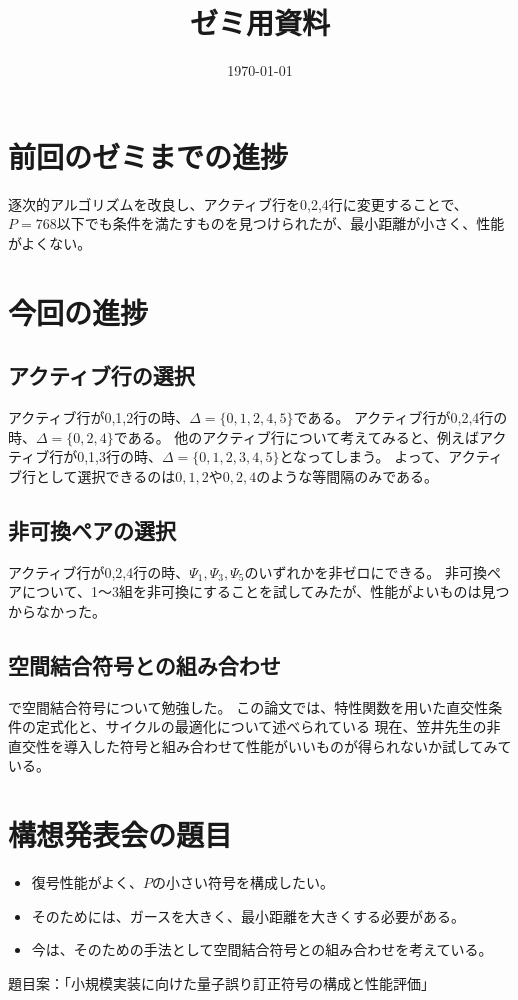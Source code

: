\documentclass[a4paper,11pt,dvipdfmx]{jsarticle}
\theoremstyle{definition}
\begin{document}
\title{ゼミ用資料}
\author{}
\date{\today}
\maketitle

\section{前回のゼミまでの進捗}
逐次的アルゴリズムを改良し、アクティブ行を0,2,4行に変更することで、$P=768$以下でも条件を満たすものを見つけられたが、最小距離が小さく、性能がよくない。

\section{今回の進捗}

\subsection{アクティブ行の選択}
アクティブ行が0,1,2行の時、$\Delta=\{0,1,2,4,5\}$である。
アクティブ行が0,2,4行の時、$\Delta=\{0,2,4\}$である。
他のアクティブ行について考えてみると、例えばアクティブ行が0,1,3行の時、$\Delta=\{0,1,2,3,4,5\}$となってしまう。
よって、アクティブ行として選択できるのは$0,1,2$や$0,2,4$のような等間隔のみである。

\subsection{非可換ペアの選択}
アクティブ行が0,2,4行の時、$\Psi_1, \Psi_3, \Psi_5$のいずれかを非ゼロにできる。
非可換ペアについて、1～3組を非可換にすることを試してみたが、性能がよいものは見つからなかった。

\subsection{空間結合符号との組み合わせ}
\cite{yang2025spatially}で空間結合符号について勉強した。
この論文では、特性関数を用いた直交性条件の定式化と、サイクルの最適化について述べられている
現在、笠井先生の非直交性を導入した符号と組み合わせて性能がいいものが得られないか試してみている。

\section{構想発表会の題目}
\begin{itemize}
  \item 復号性能がよく、$P$の小さい符号を構成したい。
  \item そのためには、ガースを大きく、最小距離を大きくする必要がある。
  \item 今は、そのための手法として空間結合符号との組み合わせを考えている。
\end{itemize}
題目案：「小規模実装に向けた量子誤り訂正符号の構成と性能評価」





\end{document}

